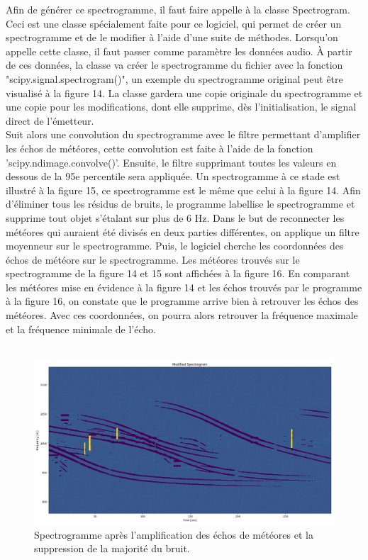 \documentclass[11pt]{article}
\begin{document}
Afin de générer ce spectrogramme, il faut faire appelle à la classe Spectrogram.
Ceci est une classe spécialement faite pour ce logiciel, qui permet de créer un spectrogramme et de le modifier à l'aide d'une suite de méthodes.
Lorsqu'on appelle cette classe, il faut passer comme paramètre les données audio.
À partir de ces données, la classe va créer le spectrogramme du fichier avec la fonction "scipy.signal.spectrogram()", un exemple du spectrogramme original peut être visualisé à la figure 14.
La classe gardera une copie originale du spectrogramme et une copie pour les modifications, dont elle supprime, dès l'initialisation, le signal direct de l'émetteur.\\
Suit alors une convolution du spectrogramme avec le filtre permettant d'amplifier les échos de météores, cette convolution est faite à l'aide de la fonction 'scipy.ndimage.convolve()'.
Ensuite, le filtre supprimant toutes les valeurs en dessous de la 95e percentile sera appliquée.
Un spectrogramme à ce stade est illustré à la figure 15, ce spectrogramme est le même que celui à la figure 14.
Afin d'éliminer tous les résidus de bruits, le programme labellise le spectrogramme et supprime tout objet s'étalant sur plus de 6 Hz.
Dans le but de reconnecter les météores qui auraient été divisés en deux parties différentes, on applique un filtre moyenneur sur le spectrogramme.
Puis, le logiciel cherche les coordonnées des échos de météore sur le spectrogramme.
Les météores trouvés sur le spectrogramme de la figure 14 et 15 sont affichées à la figure 16.
En comparant les météores mise en évidence à la figure 14 et les échos trouvés par le programme à la figure 16, on constate que le programme arrive bien à retrouver les échos des météores.
Avec ces coordonnées, on pourra alors retrouver la fréquence maximale et la fréquence minimale de l'écho.\\
\\
\begin{figure}[t]
    \begin{center}
        \includegraphics[scale=0.22]{Screenshot from 2022-05-31 16-33-53.png}
        \caption{Spectrogramme après l'amplification des échos de météores et la suppression de la majorité du bruit.}
    \end{center}
\end{figure}
\end{document}
